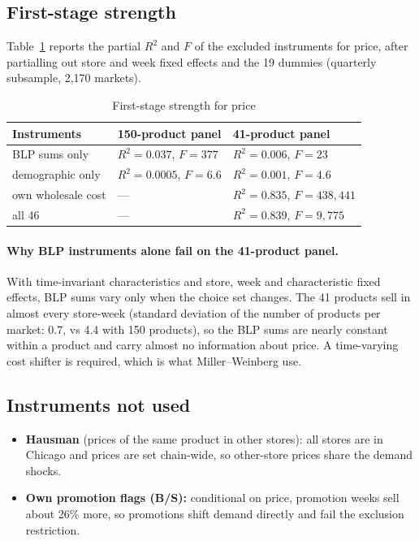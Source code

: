 \documentclass[11pt]{article}
\begin{document}
\subsection{First-stage strength}\label{sec:firststage}

Table~\ref{tab:firststage} reports the partial $R^2$ and $F$ of the excluded instruments for
price, after partialling out store and week fixed effects and the 19 dummies (quarterly
subsample, 2,170 markets).

\begin{table}[htbp]
\centering
\small
\caption{First-stage strength for price}\label{tab:firststage}
\begin{tabular}{@{}lll@{}}
\toprule
Instruments & 150-product panel & 41-product panel \\
\midrule
BLP sums only & $R^2 = 0.037$, $F = 377$ & $R^2 = 0.006$, $F = 23$ \\
demographic only & $R^2 = 0.0005$, $F = 6.6$ & $R^2 = 0.001$, $F = 4.6$ \\
own wholesale cost & --- & $R^2 = \mathbf{0.835}$, $F = 438{,}441$ \\
all 46 & --- & $R^2 = 0.839$, $F = 9{,}775$ \\
\bottomrule
\end{tabular}
\end{table}

\paragraph{Why BLP instruments alone fail on the 41-product panel.} With time-invariant
characteristics and store, week and characteristic fixed effects, BLP sums vary only when the
choice set changes. The 41 products sell in almost every store-week (standard deviation of the
number of products per market: 0.7, vs 4.4 with 150 products), so the BLP sums are nearly
constant within a product and carry almost no information about price. A time-varying cost
shifter is required, which is what Miller--Weinberg use.

\subsection{Instruments not used}\label{sec:notused}

\begin{itemize}
  \item \textbf{Hausman} (prices of the same product in other stores): all stores are in
        Chicago and prices are set chain-wide, so other-store prices share the demand shocks.
  \item \textbf{Own promotion flags (B/S):} conditional on price, promotion weeks sell about
        26\% more, so promotions shift demand directly and fail the exclusion restriction.
\end{itemize}
\end{document}
